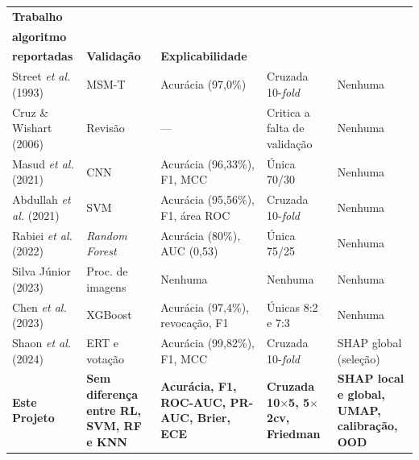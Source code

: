 \documentclass[
    12pt
    ,oneside
    ,a4paper
    ,chapter=TITLE
    ,section=TITLE
    ,sumario=abnt-6027-2012
    ,english,brazil]{abntex2} %
\begin{document}
\begin{quadro}[H]
    \centering
    \setlength{\tabcolsep}{2pt}
    \small
    \begin{tabular}{|>{\raggedright\arraybackslash}p{2.7cm}|>{\raggedright\arraybackslash}p{2.4cm}|>{\raggedright\arraybackslash}p{3.9cm}|>{\raggedright\arraybackslash}p{2.9cm}|>{\raggedright\arraybackslash}p{3.0cm}|}
        \hline
        \textbf{Trabalho} & \makecell[l]{\textbf{Melhor}\\\textbf{algoritmo}}
        & \makecell[l]{\textbf{Métricas}\\\textbf{reportadas}}
        & \textbf{Validação}
        & \textbf{Explicabilidade} \\
        \hline
        Street \textit{et al.} (1993) & MSM-T & Acurácia (97,0\%) & Cruzada 10-\textit{fold} & Nenhuma \\ \hline
        Cruz \& Wishart (2006) & Revisão & --- & Critica a falta de validação & Nenhuma \\ \hline
        Masud \textit{et al.} (2021) & CNN & Acurácia (96,33\%), F1, MCC & Única 70/30 & Nenhuma \\ \hline
        Abdullah \textit{et al.} (2021) & SVM & Acurácia (95,56\%), F1, área ROC & Cruzada 10-\textit{fold} & Nenhuma \\ \hline
        Rabiei \textit{et al.} (2022) & \textit{Random Forest} & Acurácia (80\%), AUC (0,53) & Única 75/25 & Nenhuma \\ \hline
        Silva Júnior (2023) & Proc. de imagens & Nenhuma & Nenhuma & Nenhuma \\ \hline
        Chen \textit{et al.} (2023) & XGBoost & Acurácia (97,4\%), revocação, F1 & Únicas 8:2 e 7:3 & Nenhuma \\ \hline
        Shaon \textit{et al.} (2024) & ERT e votação & Acurácia (99,82\%), F1, MCC & Cruzada 10-\textit{fold} & SHAP global (seleção) \\ \hline
        \textbf{Este Projeto} & \textbf{Sem diferença entre RL, SVM, RF e KNN} & \textbf{Acurácia, F1, ROC-AUC, PR-AUC, Brier, ECE} & \textbf{Cruzada 10$\times$5, 5$\times$2cv, Friedman} & \textbf{SHAP local e global, UMAP, calibração, OOD} \\ \hline
    \end{tabular}
    \vspace{0.2cm}
    \fonteautor
\end{quadro}
\endgroup
\end{document}
